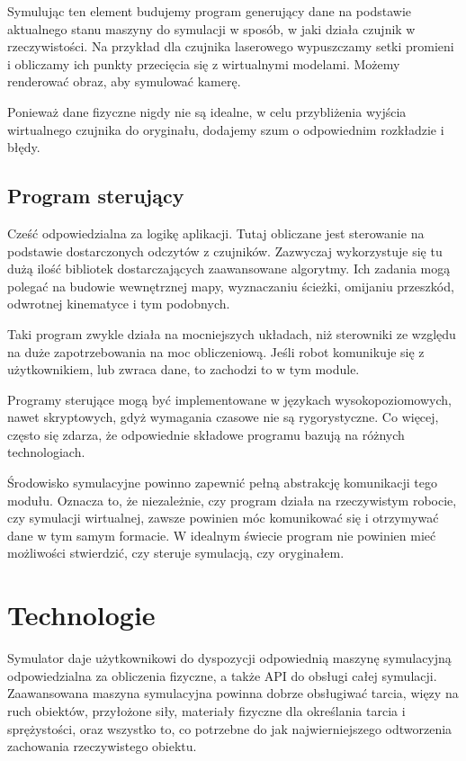 Symulując ten element budujemy program generujący dane na podstawie aktualnego stanu maszyny do symulacji w sposób, w jaki działa czujnik w rzeczywistości.
Na przykład dla czujnika laserowego wypuszczamy setki promieni i obliczamy ich punkty przecięcia się z wirtualnymi modelami.
Możemy renderować obraz, aby symulować kamerę.

Ponieważ dane fizyczne nigdy nie są idealne, w celu przybliżenia wyjścia wirtualnego czujnika do oryginału, dodajemy szum o odpowiednim rozkładzie i błędy.

\subsection{Program sterujący}
Cześć odpowiedzialna za logikę aplikacji. Tutaj obliczane jest sterowanie na podstawie dostarczonych odczytów z czujników.
Zazwyczaj wykorzystuje się tu dużą ilość bibliotek dostarczających zaawansowane algorytmy.
Ich zadania mogą polegać na budowie wewnętrznej mapy, wyznaczaniu ścieżki, omijaniu przeszkód, odwrotnej kinematyce i tym podobnych.

Taki program zwykle działa na mocniejszych układach, niż sterowniki ze względu na duże zapotrzebowania na moc obliczeniową.
Jeśli robot komunikuje się z użytkownikiem, lub zwraca dane, to zachodzi to w tym module. 

Programy sterujące mogą być implementowane w językach wysokopoziomowych, nawet skryptowych, gdyż wymagania czasowe nie są rygorystyczne.
Co więcej, często się zdarza, że odpowiednie składowe programu bazują na różnych technologiach.

Środowisko symulacyjne powinno zapewnić pełną abstrakcję komunikacji tego modułu.
Oznacza to, że niezależnie, czy program działa na rzeczywistym robocie, czy symulacji wirtualnej, zawsze powinien móc komunikować się i otrzymywać dane w tym samym formacie.
W idealnym świecie program nie powinien mieć możliwości stwierdzić, czy steruje symulacją, czy oryginałem.

\section{Technologie}
Symulator daje użytkownikowi do dyspozycji odpowiednią maszynę symulacyjną odpowiedzialna za obliczenia fizyczne, a także API do obsługi całej symulacji.
Zaawansowana maszyna symulacyjna powinna dobrze obsługiwać tarcia, więzy na ruch obiektów, przyłożone siły, materiały fizyczne dla określania tarcia i sprężystości, 
oraz wszystko to, co potrzebne do jak najwierniejszego odtworzenia zachowania rzeczywistego obiektu.

